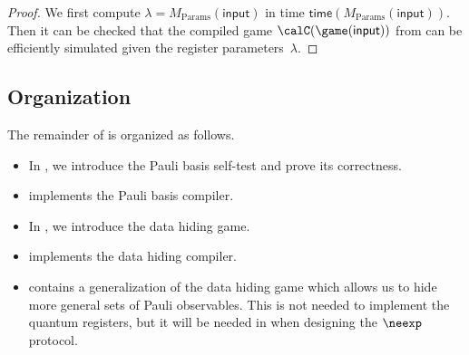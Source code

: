 \begin{proof}
We first compute $\lambda = M_{\mathrm{Params}}(\mathsf{input})$
in time $\mathsf{time}(M_{\mathrm{Params}}(\mathsf{input}))$.
Then it can be checked that the compiled game $\calC(\game(\mathsf{input}))$ from 
can be efficiently simulated given the register parameters~$\lambda$.
\end{proof}

\subsection{Organization}

The remainder of  is organized as follows.
\begin{itemize}
\item In , we introduce the Pauli basis self-test and prove its correctness.
\item {} implements the Pauli basis compiler.
\item In , we introduce the data hiding game.
\item {} implements the data hiding compiler.
\item {} contains a generalization of the data hiding game which allows us to hide more general sets of Pauli observables.
		This is not needed to implement the quantum registers, but it will be needed in  when designing the $\neexp$ protocol.
\end{itemize}



